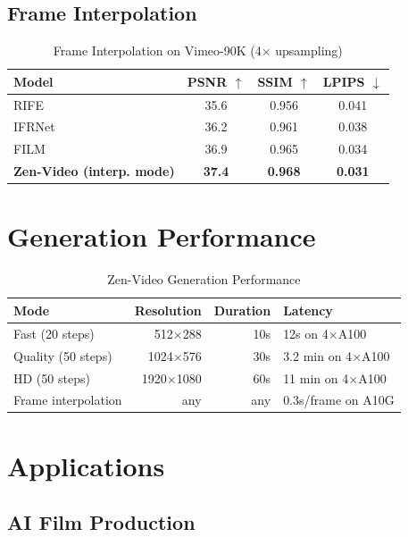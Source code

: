 \documentclass[11pt,a4paper]{article}
\begin{document}
\subsection{Frame Interpolation}

\begin{table}[H]
\centering
\begin{tabular}{lccc}
\toprule
\textbf{Model} & \textbf{PSNR} $\uparrow$ & \textbf{SSIM} $\uparrow$ & \textbf{LPIPS} $\downarrow$ \\
\midrule
RIFE & 35.6 & 0.956 & 0.041 \\
IFRNet & 36.2 & 0.961 & 0.038 \\
FILM & 36.9 & 0.965 & 0.034 \\
\textbf{Zen-Video (interp. mode)} & \textbf{37.4} & \textbf{0.968} & \textbf{0.031} \\
\bottomrule
\end{tabular}
\caption{Frame Interpolation on Vimeo-90K (4$\times$ upsampling)}
\end{table}

\section{Generation Performance}

\begin{table}[H]
\centering
\begin{tabular}{lrrl}
\toprule
\textbf{Mode} & \textbf{Resolution} & \textbf{Duration} & \textbf{Latency} \\
\midrule
Fast (20 steps) & 512$\times$288 & 10s & 12s on 4$\times$A100 \\
Quality (50 steps) & 1024$\times$576 & 30s & 3.2 min on 4$\times$A100 \\
HD (50 steps) & 1920$\times$1080 & 60s & 11 min on 4$\times$A100 \\
Frame interpolation & any & any & 0.3s/frame on A10G \\
\bottomrule
\end{tabular}
\caption{Zen-Video Generation Performance}
\end{table}

\section{Applications}

\subsection{AI Film Production}
\end{document}
